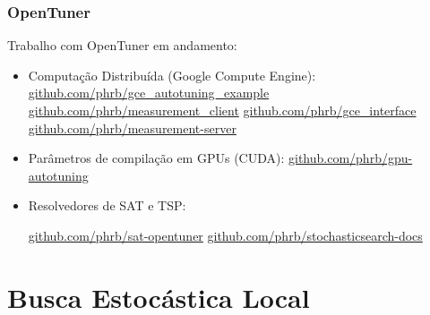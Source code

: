 \documentclass[10pt, compress]{beamer}
\begin{document}
\begin{frame}[fragile]
    \frametitle{OpenTuner}
    Trabalho com OpenTuner em andamento:
    \begin{itemize}
        \item Computação Distribuída (\alert{Google Compute Engine}):
            \url{github.com/phrb/gce\_autotuning\_example}
            \url{github.com/phrb/measurement\_client}
            \url{github.com/phrb/gce\_interface}
            \url{github.com/phrb/measurement-server}
        \item Parâmetros de compilação em GPUs (\alert{CUDA}):
            \url{github.com/phrb/gpu-autotuning}
        \item Resolvedores de \alert{SAT} e \alert{TSP}:

            \url{github.com/phrb/sat-opentuner}
            \url{github.com/phrb/stochasticsearch-docs}
    \end{itemize}
\end{frame}

\section{Busca Estocástica Local}
\end{document}
